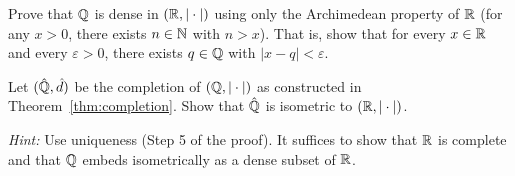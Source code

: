\documentclass[11pt,a4paper]{article}
\begin{document}
\begin{exercise}[Density of $\Q$ in $\R$]
\label{ex:Q_dense}
Prove that $\Q$ is dense in $(\mathbb{R}, |\cdot|)$ using only the Archimedean
property of $\R$ (for any $x > 0$, there exists $n \in \mathbb{N}$ with $n > x$).
That is, show that for every $x \in \mathbb{R}$ and every $\varepsilon > 0$, there
exists $q \in \mathbb{Q}$ with $|x - q| < \varepsilon$.
\end{exercise}

\begin{exercise}
\label{ex:Q_completion}
Let $(\hat{\mathbb{Q}}, \hat{d})$ be the completion of $(\mathbb{Q}, |\cdot|)$ as constructed
in Theorem~\ref{thm:completion}. Show that $\hat{\mathbb{Q}}$ is isometric to
$(\mathbb{R}, |\cdot|)$.

\emph{Hint:} Use uniqueness (Step 5 of the proof). It suffices to show that
$\R$ is complete and that $\Q$ embeds isometrically as a dense subset of $\R$.
\end{exercise}


\end{document}
